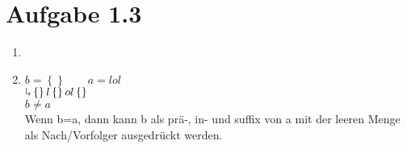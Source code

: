 \documentclass[11pt,a4paper]{article}
\begin{document}
	\section*{Aufgabe 1.3}
	\begin{enumerate}
		\item
		\item 	$b=\left\lbrace \right\rbrace \qquad a=lol$\\
				$\rotatebox[origin=c]{180}{$\Lsh$}  \left\lbrace\right\rbrace l\left\lbrace\right\rbrace ol\left\lbrace\right\rbrace$\\
				$b \neq a$\\
				Wenn b=a, dann kann b als prä-, in- und suffix von a mit der leeren Menge als Nach/Vorfolger ausgedrückt werden. 
	\end{enumerate}
\end{document}
